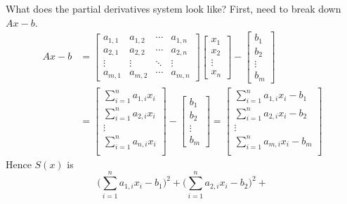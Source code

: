 \documentclass{article}
\begin{document}
\begin{enumerate}
  What does the partial derivatives system look like? First, need to break down $Ax - b$.
  {
  \everymath{\displaystyle}
  \begin{align*}  
    Ax-b &= 
    \begin{bmatrix}
        a_{1,1} & a_{1,2} & \cdots & a_{1,n} \\
        a_{2,1} & a_{2,2} & \cdots & a_{2,n} \\
        \vdots  & \vdots  & \ddots & \vdots  \\
        a_{m,1} & a_{m,2} & \cdots & a_{m,n} 
    \end{bmatrix}
    \begin{bmatrix}
        x_{1} \\
        x_{2} \\
        \vdots \\
        x_{n}
    \end{bmatrix}
     - 
    \begin{bmatrix}
        b_{1} \\
        b_{2} \\
        \vdots \\
        b_{m}
    \end{bmatrix} \\
    &= 
    \begin{bmatrix}
        \sum_{i=1}^n a_{1,i} x_{i} \\
        \sum_{i=1}^n a_{2,i} x_{i} \\
        \vdots \\
        \sum_{i=1}^n a_{n,i} x_{i} \\
    \end{bmatrix}
     - 
    \begin{bmatrix}
        b_{1} \\
        b_{2} \\
        \vdots \\
        b_{m}
    \end{bmatrix} 
    = 
    \begin{bmatrix}
        \sum_{i=1}^n a_{1,i} x_{i} - b_1 \\
        \sum_{i=1}^n a_{2,i} x_{i} - b_2\\
        \vdots \\
        \sum_{i=1}^n a_{m,i} x_{i} - b_m\\
    \end{bmatrix}
  \end{align*}
  Hence $S(x)$ is 
    \[  \Big(\sum_{i=1}^n a_{1,i} x_{i} - b_1 \Big)^2 +
        \Big(\sum_{i=1}^n a_{2,i} x_{i} - b_2 \Big)^2 +
\]}
\end{enumerate}
\end{document}

